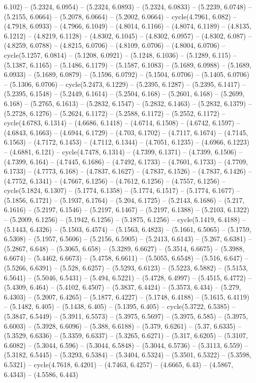 6.102) -- (5.2324, 6.0954) -- (5.2324, 6.0893) -- (5.2324, 6.0833) -- (5.2239, 6.0748) -- (5.2155, 6.0664) -- (5.2078, 6.0664) -- (5.2002, 6.0664) -- cycle(4.7961, 6.082) -- (4.7918, 6.0933) -- (4.7966, 6.1049) -- (4.8014, 6.1166) -- (4.8074, 6.1189) -- (4.8135, 6.1212) -- (4.8219, 6.1128) -- (4.8302, 6.1045) -- (4.8302, 6.0957) -- (4.8302, 6.087) -- (4.8259, 6.0788) -- (4.8215, 6.0706) -- (4.8109, 6.0706) -- (4.8004, 6.0706) -- cycle(5.1257, 6.0814) -- (5.1208, 6.0921) -- (5.1248, 6.1036) -- (5.1289, 6.115) -- (5.1387, 6.1165) -- (5.1486, 6.1179) -- (5.1587, 6.1083) -- (5.1689, 6.0988) -- (5.1689, 6.0933) -- (5.1689, 6.0879) -- (5.1596, 6.0792) -- (5.1504, 6.0706) -- (5.1405, 6.0706) -- (5.1306, 6.0706) -- cycle(5.2473, 6.1229) -- (5.2395, 6.1287) -- (5.2395, 6.1417) -- (5.2395, 6.1548) -- (5.2449, 6.1614) -- (5.2504, 6.168) -- (5.2601, 6.168) -- (5.2699, 6.168) -- (5.2765, 6.1613) -- (5.2832, 6.1547) -- (5.2832, 6.1463) -- (5.2832, 6.1379) -- (5.2728, 6.1276) -- (5.2624, 6.1172) -- (5.2588, 6.1172) -- (5.2552, 6.1172) -- cycle(4.6783, 6.1314) -- (4.6686, 6.1418) -- (4.6714, 6.1508) -- (4.6742, 6.1597) -- (4.6843, 6.1663) -- (4.6944, 6.1729) -- (4.703, 6.1702) -- (4.7117, 6.1674) -- (4.7145, 6.1563) -- (4.7172, 6.1453) -- (4.7112, 6.1344) -- (4.7051, 6.1235) -- (4.6966, 6.1223) -- (4.6881, 6.121) -- cycle(4.7478, 6.1314) -- (4.7399, 6.1371) -- (4.7399, 6.1506) -- (4.7399, 6.164) -- (4.7445, 6.1686) -- (4.7492, 6.1733) -- (4.7601, 6.1733) -- (4.7709, 6.1733) -- (4.7773, 6.168) -- (4.7837, 6.1627) -- (4.7837, 6.1526) -- (4.7837, 6.1426) -- (4.7752, 6.1341) -- (4.7667, 6.1256) -- (4.7612, 6.1256) -- (4.7557, 6.1256) -- cycle(5.1824, 6.1307) -- (5.1774, 6.1358) -- (5.1774, 6.1517) -- (5.1774, 6.1677) -- (5.1856, 6.1721) -- (5.1937, 6.1764) -- (5.204, 6.1725) -- (5.2143, 6.1686) -- (5.217, 6.1616) -- (5.2197, 6.1546) -- (5.2197, 6.1467) -- (5.2197, 6.1388) -- (5.2103, 6.1322) -- (5.2009, 6.1256) -- (5.1942, 6.1256) -- (5.1875, 6.1256) -- cycle(5.1419, 6.4188) -- (5.1443, 6.4326) -- (5.1503, 6.4574) -- (5.1563, 6.4823) -- (5.1661, 6.5065) -- (5.1759, 6.5308) -- (5.1957, 6.5606) -- (5.2156, 6.5905) -- (5.2413, 6.6143) -- (5.267, 6.6381) -- (5.2867, 6.648) -- (5.3065, 6.658) -- (5.3289, 6.6627) -- (5.3514, 6.6675) -- (5.3988, 6.6674) -- (5.4462, 6.6673) -- (5.4758, 6.6611) -- (5.5055, 6.6548) -- (5.516, 6.647) -- (5.5266, 6.6391) -- (5.528, 6.6257) -- (5.5293, 6.6123) -- (5.5223, 6.5882) -- (5.5153, 6.5641) -- (5.5046, 6.5431) -- (5.494, 6.5221) -- (5.4728, 6.4997) -- (5.4515, 6.4772) -- (5.4309, 6.464) -- (5.4102, 6.4507) -- (5.3837, 6.4424) -- (5.3573, 6.434) -- (5.279, 6.4303) -- (5.2007, 6.4265) -- (5.1877, 6.4227) -- (5.1748, 6.4188) -- (5.1615, 6.4119) -- (5.1482, 6.405) -- (5.1438, 6.405) -- (5.1395, 6.405) -- cycle(5.3722, 6.5385) -- (5.3847, 6.5449) -- (5.3911, 6.5573) -- (5.3975, 6.5697) -- (5.3975, 6.585) -- (5.3975, 6.6003) -- (5.3928, 6.6096) -- (5.388, 6.6188) -- (5.379, 6.6261) -- (5.37, 6.6335) -- (5.3529, 6.6336) -- (5.3359, 6.6337) -- (5.3265, 6.6271) -- (5.317, 6.6205) -- (5.3107, 6.6082) -- (5.3044, 6.596) -- (5.3044, 6.5848) -- (5.3044, 6.5736) -- (5.3113, 6.559) -- (5.3182, 6.5445) -- (5.3293, 6.5384) -- (5.3404, 6.5324) -- (5.3501, 6.5322) -- (5.3598, 6.5321) -- cycle(4.7618, 6.4201) -- (4.7463, 6.4257) -- (4.6665, 6.43) -- (4.5867, 6.4343) -- (4.5586, 6.443) 